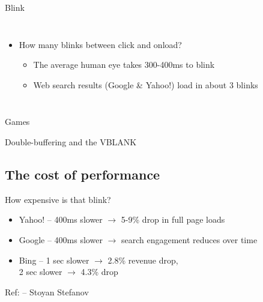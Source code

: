 \documentclass{beamer}
\begin{document}
\begin{frame}{Blink}
  \begin{columns}[t]
  \begin{itemize}
  \item How many blinks between click and onload?
    \begin{itemize}
    \item<2-> The average human eye takes 300-400ms to blink
    \item<3-> Web search results (Google \& Yahoo!) load in about 3 blinks
    \end{itemize}
  \end{itemize}
  \end{columns}
\end{frame}

\begin{frame}{Games}
  \begin{block}{}
  \begin{center}
  Double-buffering and the VBLANK
  \end{center}
  \end{block}
\end{frame}

\subsection{The cost of performance}

\begin{frame}{How expensive is that blink?}
  \begin{itemize}
  \item Yahoo! -- 400ms slower $\rightarrow$ 5-9\% drop in full page loads
  \item Google -- 400ms slower $\rightarrow$ search engagement reduces over time
  \item Bing -- 1 sec slower $\rightarrow$ 2.8\% revenue drop, \\ 2 sec slower $\rightarrow$ 4.3\% drop
  \end{itemize}
  \vfill
  \tiny{Ref: \href{http://www.slideshare.net/stoyan/the-business-of-performance}{} -- Stoyan Stefanov}
\end{frame}
\end{document}
